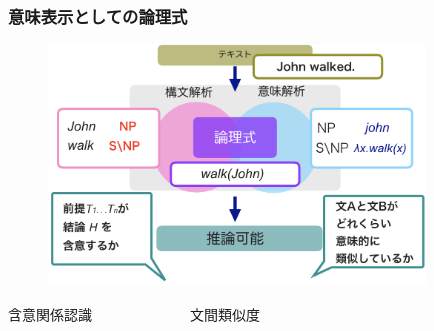 \documentclass[dvipdfmx]{beamer}
\begin{document}
\begin{frame}
\frametitle{意味表示としての論理式}
\begin{center}
\begin{figure}[h]
	\includegraphics[width=10cm]{backend1.png}
        \label{fig:backend1}
\end{figure}
\vspace{-1zh}
\begin{center}
含意関係認識　　　　　　　文間類似度\\
\small{\citep{ccg2lambda}}　　\small{\citep{yanaka2017determining}}
\end{center}
\end{center}


\end{frame}


\end{document}
